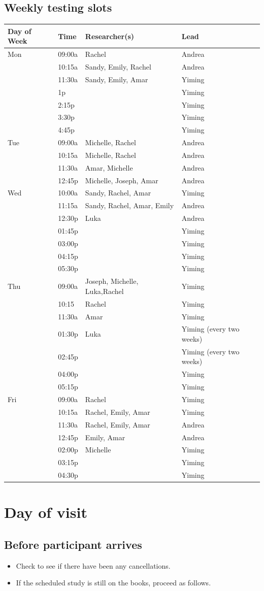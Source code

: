 \documentclass[]{article}
\providecommand{\tightlist}{%
  \setlength{\itemsep}{0pt}\setlength{\parskip}{0pt}}
\begin{document}
\subsection{Weekly testing slots}\label{weekly-testing-slots}

\begin{longtable}[]{@{}llll@{}}
\toprule
Day of Week & Time & Researcher(s) & Lead\tabularnewline
\midrule
\endhead
Mon & 09:00a & Rachel & Andrea\tabularnewline
& 10:15a & Sandy, Emily, Rachel & Andrea\tabularnewline
& 11:30a & Sandy, Emily, Amar & Yiming\tabularnewline
& 1p & & Yiming\tabularnewline
& 2:15p & & Yiming\tabularnewline
& 3:30p & & Yiming\tabularnewline
& 4:45p & & Yiming\tabularnewline
Tue & 09:00a & Michelle, Rachel & Andrea\tabularnewline
& 10:15a & Michelle, Rachel & Andrea\tabularnewline
& 11:30a & Amar, Michelle & Andrea\tabularnewline
& 12:45p & Michelle, Joseph, Amar & Andrea\tabularnewline
Wed & 10:00a & Sandy, Rachel, Amar & Yiming\tabularnewline
& 11:15a & Sandy, Rachel, Amar, Emily & Andrea\tabularnewline
& 12:30p & Luka & Andrea\tabularnewline
& 01:45p & & Yiming\tabularnewline
& 03:00p & & Yiming\tabularnewline
& 04:15p & & Yiming\tabularnewline
& 05:30p & & Yiming\tabularnewline
Thu & 09:00a & Joseph, Michelle, Luka,Rachel & Yiming\tabularnewline
& 10:15 & Rachel & Yiming\tabularnewline
& 11:30a & Amar & Yiming\tabularnewline
& 01:30p & Luka & Yiming (every two weeks)\tabularnewline
& 02:45p & & Yiming (every two weeks)\tabularnewline
& 04:00p & & Yiming\tabularnewline
& 05:15p & & Yiming\tabularnewline
Fri & 09:00a & Rachel & Yiming\tabularnewline
& 10:15a & Rachel, Emily, Amar & Yiming\tabularnewline
& 11:30a & Rachel, Emily, Amar & Andrea\tabularnewline
& 12:45p & Emily, Amar & Andrea\tabularnewline
& 02:00p & Michelle & Yiming\tabularnewline
& 03:15p & & Yiming\tabularnewline
& 04:30p & & Yiming\tabularnewline
\bottomrule
\end{longtable}

\section{Day of visit}\label{day-of-visit}

\subsection{Before participant
arrives}\label{before-participant-arrives}

\begin{itemize}
\tightlist
\item
  Check to see if there have been any cancellations.
\item
  If the scheduled study is still on the books, proceed as follows.
\end{itemize}
\end{document}
